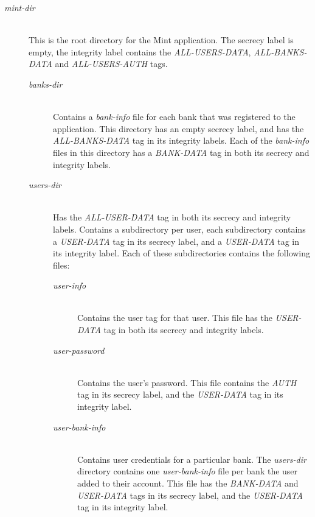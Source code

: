 \begin{description}
  \item[\emph{mint-dir}] \ \\
    This is the root directory for the Mint 
    application.
    The secrecy label is empty, the integrity 
    label contains the \emph{ALL-USERS-DATA}, 
    \emph{ALL-BANKS-DATA} and 
    \emph{ALL-USERS-AUTH} tags.
  \begin{description}
    \item[\emph{banks-dir}] \ \\
      Contains a \emph{bank-info} file for each 
      bank that was registered to the 
      application. This 
      directory has an empty secrecy label, and 
      has the \emph{ALL-BANKS-DATA} tag in its 
      integrity labels.
      Each of the \emph{bank-info} files in 
      this directory has a \emph{BANK-DATA} 
      tag in both its secrecy and integrity 
      labels.
    \item[\emph{users-dir}] \ \\
      Has the \emph{ALL-USER-DATA} tag in both 
      its secrecy and integrity labels. Contains 
      a subdirectory per user, each subdirectory 
      contains a \emph{USER-DATA} tag in its 
      secrecy label, and a \emph{USER-DATA} tag 
      in its integrity label.
      Each of these subdirectories contains the 
      following files:
      \begin{description}
        \item[\emph{user-info}] \ \\
          Contains the user tag for that user.
          This file has the \emph{USER-DATA} tag 
          in both its secrecy and integrity labels.
        \item[\emph{user-password}] \ \\
          Contains the user's password.
          This file contains the \emph{AUTH} tag in 
          its secrecy label, and the \emph{USER-DATA} 
          tag in its integrity label.
        \item[\emph{user-bank-info}] \ \\
          Contains user credentials for a particular 
          bank.
          The \emph{users-dir} directory contains 
          one \emph{user-bank-info} file per bank 
          the user added to their account.
          This file has the \emph{BANK-DATA} and 
          \emph{USER-DATA} tags in its secrecy label, 
          and the \emph{USER-DATA} tag in its 
          integrity label.
      \end{description}
  \end{description}
\end{description}


